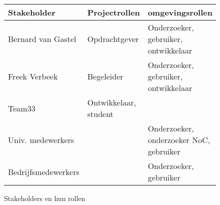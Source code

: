 \begin{figure}
{\small\sf
\begin{center}
\begin{tabular}{lll}\hline
{\bf Stakeholder}    & {\bf Projectrollen}   & {\bf omgevingsrollen} \\\hline
Bernard van Gastel   & Opdrachtgever         & Onderzoeker, gebruiker, ontwikkelaar\\
Freek Verbeek        & Begeleider            & Onderzoeker, gebruiker, ontwikkelaar \\
Team33               & Ontwikkelaar, student & \\
Univ. medewerkers    &                       & Onderzoeker, onderzoeker NoC, gebruiker \\
Bedrijfsmedewerkers  &                       & Onderzoeker, gebruiker \\
\hline
\end{tabular}
\end{center}
}%
\caption{Stakeholders en hun rollen}\label{fig:stakeholders}
\end{figure}

